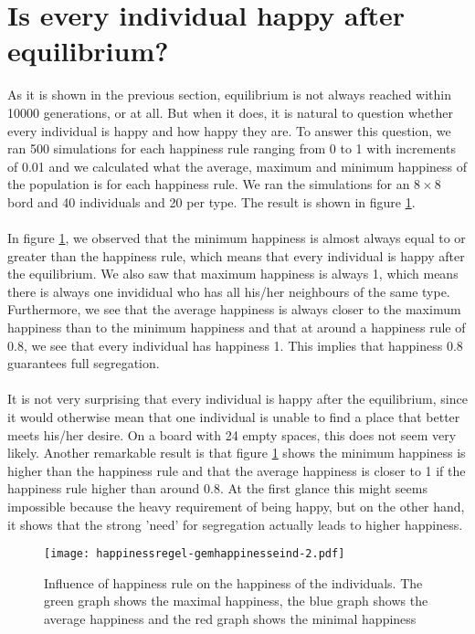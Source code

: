 
\section{Is every individual happy after equilibrium?}
As it is shown in the previous section, equilibrium is not always reached within 10000 generations, or at all. 
But when it does, it is natural to question whether every individual is happy and how happy they are. 
To answer this question, we ran 500 simulations for each happiness rule ranging from 0 to 1 with increments of 0.01 and we calculated what the average, maximum and minimum happiness of the population is for each happiness rule. 
We ran the simulations for an $8\times 8$ bord and 40 individuals and 20 per type. 
The result is shown in figure \ref{happyhappy}.\\
\\
In figure \ref{happyhappy}, we observed that the minimum happiness is almost always equal to or greater than the happiness rule, which means that every individual is happy after the equilibrium. 
We also saw that maximum happiness is always 1, which means there is always one invididual who has all his/her neighbours of the same type. 
Furthermore, we see that the average happiness is always closer to the maximum happiness than to the minimum happiness and that at around a happiness rule of 0.8, we see that every individual has happiness 1. 
This implies that happiness 0.8 guarantees full segregation.\\
\\
It is not very surprising that every individual is happy after the equilibrium, since it would otherwise mean that one individual is unable to find a place that better meets his/her desire. 
On a board with 24 empty spaces, this does not seem very likely. 
Another remarkable result is that figure \ref{happyhappy} shows the minimum happiness is higher than the happiness rule and that the average happiness is closer to 1 if the happiness rule higher than around 0.8. 
At the first glance this might seems impossible because the heavy requirement of being happy, but on the other hand, it shows that the strong 'need' for segregation actually leads to higher happiness.
\begin{figure}[h!]
    \centering
    \texttt{[image: happinessregel-gemhappinesseind-2.pdf]}
    \caption{Influence of happiness rule on the happiness of the individuals. The green graph shows the maximal happiness, the blue graph shows the average happiness and the red graph shows the minimal happiness}
    \label{happyhappy}
\end{figure}
